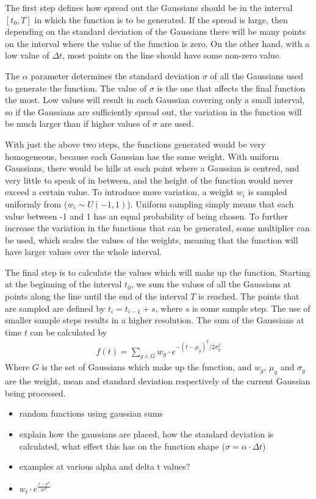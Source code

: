 \documentclass[a4paper,11pt]{article}
\begin{document}
The first step defines how spread out the Gaussians should be in the interval
$[t_0, T]$ in which the function is to be generated. If the spread is large,
then depending on the standard deviation of the Gaussians there will be many
points on the interval where the value of the function is zero. On the other
hand, with a low value of $\Delta t$, most points on the line should have some
non-zero value.

The $\alpha$ parameter determines the standard deviation $\sigma$ of all the Gaussians
used to generate the function. The value of $\sigma$ is the one that affects the
final function the most. Low values will result in each Gaussian covering only a
small interval, so if the Gaussians are sufficiently spread out, the variation
in the function will be much larger than if higher values of $\sigma$ are used.

With just the above two steps, the functions generated would be very
homogeneous, because each Gaussian has the same weight. With uniform Gaussians,
there would be hills at each point where a Gaussian is centred, and very little
to speak of in between, and the height of the function would never exceed a
certain value. To introduce more variation, a weight $w_i$ is sampled uniformly
from ($w_i \sim U(-1,1)$). Uniform sampling simply means that each value between
-1 and 1 has an equal probability of being chosen. To further increase the
variation in the functions that can be generated, some multiplier can be used,
which scales the values of the weights, meaning that the function will have
larger values over the whole interval.

The final step is to calculate the values which will make up the
function. Starting at the beginning of the interval $t_0$, we sum the values of
all the Gaussians at points along the line until the end of the interval $T$ is
reached. The points that are sampled are defined by $t_i=t_{i-1}+s$, where $s$
is some sample step. The use of smaller sample steps results in a higher
resolution. The sum of the Gaussians at time $t$ can be calculated by
\begin{align}
f(t) = \sum_{g\in G}w_g\cdot e^{-(t-\mu_g)^2/2\sigma_g^2}
\end{align}
Where $G$ is the set of Gaussians which make up the function, and $w_g$, $\mu_g$
and $\sigma_g$ are the weight, mean and standard deviation respectively of the
current Gaussian being processed.

\begin{itemize}
\item random functions using gaussian sums
\item explain how the gaussians are placed, how the standard deviation is
   calculated, what effect this has on the function shape
   ($\sigma=\alpha\cdot\Delta t$)
\item examples at various alpha and delta t values?
\item $w_t\cdot e^\frac{{x-\mu}^2}{2\sigma^2}$
\end{itemize}
\end{document}
